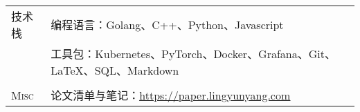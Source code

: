 \documentclass[letterpaper, 10pt]{article}
\begin{document}
\begin{longtable}{p{0.7in}p{6.0in}}



\nohyphens{技术栈}
& 编程语言：Golang、C++、Python、Javascript \\
& 工具包：Kubernetes、PyTorch、Docker、Grafana、Git、\LaTeX、SQL、Markdown \\
& \\


\nohyphens{\textsc{Misc}}
& 论文清单与笔记：\href{https://paper.lingyunyang.com}{\underline{https://paper.lingyunyang.com}} \\



\end{longtable}
\end{document}

